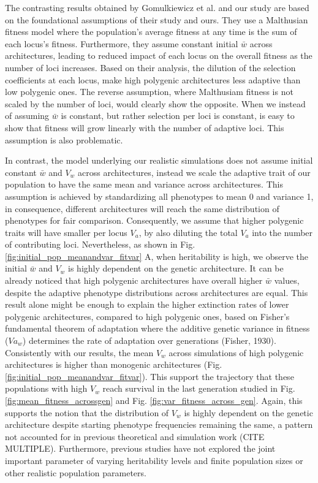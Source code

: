 \documentclass{article}
\begin{document}
The contrasting results obtained by Gomulkiewicz et al. and our study are based on the foundational assumptions of their study and ours. They use a Malthusian fitness model where the population's average fitness at any time is the sum of each locus's fitness. Furthermore, they assume constant initial $\bar{w}$ across architectures, leading to reduced impact of each locus on the overall fitness as the number of loci increases. Based on their analysis, the dilution of the selection coefficients at each locus, make high polygenic architectures less adaptive than low polygenic ones. The reverse assumption, where Malthusiam fitness is not scaled by the number of loci, would clearly show the opposite. When we instead of assuming $\bar{w}$ is constant, but rather selection per loci is constant, is easy to show that fitness will grow linearly with the number of adaptive loci. This assumption is also problematic.

In contrast, the model underlying our realistic simulations does not assume initial constant $\bar{w}$ and $V_w$ across architectures, instead we scale the adaptive trait of our population to have the same mean and variance across architectures. This assumption is achieved by standardizing all phenotypes to mean 0 and variance 1, in consequence, different architectures will reach the same distribution of phenotypes for fair comparison. Consequently, we assume that higher polygenic traits will have smaller per locus $V_a$, by also diluting the total $V_a$ into the number of contributing loci. Nevertheless, as shown in Fig. \ref{fig:initial_pop_meanandvar_fitvar} A, when heritability is high, we observe the initial $\bar{w}$ and $V_w$ is highly dependent on the genetic architecture. It can  be already noticed that high polygenic architectures have overall higher $\bar{w}$ values, despite the adaptive phenotype distributions across architectures are equal. This result alone might be enough to explain the higher extinction rates of lower polygenic architectures, compared to high polygenic ones, based on Fisher's fundamental theorem of adaptation where the additive genetic variance in fitness ($Va_w$) determines the rate of adaptation over generations (Fisher, 1930). Consistently with our results, the mean  $V_w$ across simulations of high polygenic architectures is higher than monogenic architectures (Fig. \ref{fig:initial_pop_meanandvar_fitvar}). This support the trajectory that these populations with high $V_w$  reach survival in the last generation studied in Fig. \ref{fig:mean_fitness_acrossgen} and Fig. \ref{fig:var_fitness_across_gen}. Again, this supports the notion that the distribution of $V_w$  is highly dependent on the genetic architecture despite starting phenotype frequencies remaining the same, a pattern not accounted for in previous theoretical and simulation work (CITE MULTIPLE). Furthermore, previous studies have not explored the joint important parameter of varying heritability levels and finite population sizes or other realistic population parameters.   
\end{document}
